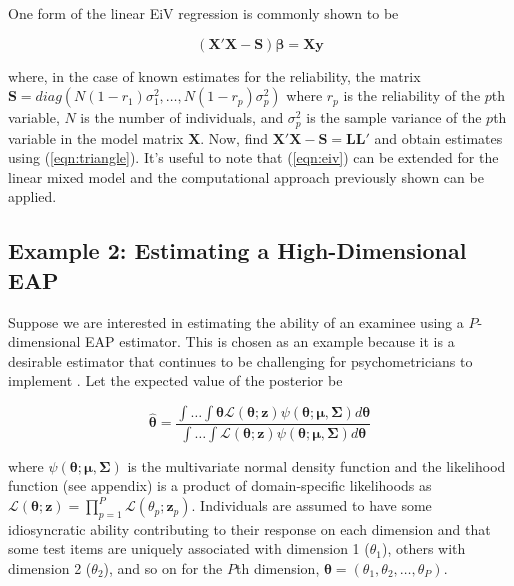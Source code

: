 \documentclass[12pt]{article}
\begin{document}
One form of the linear EiV regression is commonly shown to be \cite{stata:eiv}

\begin{equation}
\label{eqn:eiv}
(\bm{X}'\bm{X} - \bm{S})\bm{\beta} = \bm{X}\bm{y} 
\end{equation}

\noindent where, in the case of known estimates for the reliability, the matrix $\bm{S} = diag(N(1-r_1)\sigma^2_1, \ldots, N(1-r_p)\sigma^2_p) $ where $r_p$ is the reliability of the $p$th variable, $N$ is the number of individuals, and $\sigma^2_p$ is the sample variance of the $p$th variable in the model matrix $\bm{X}$.  Now, find $\bm{X}'\bm{X} - \bm{S} = \bm{L}\bm{L}'$ and obtain estimates using (\ref{eqn:triangle}). It's useful to note that (\ref{eqn:eiv}) can be extended for the linear mixed model and the computational approach previously shown can be applied. 

\subsection*{Example 2: Estimating a High-Dimensional EAP}

Suppose we are interested in estimating the ability of an examinee using a $P$-dimensional EAP estimator. This is chosen as an example because it is a desirable estimator that continues to be challenging for psychometricians to implement \cite{Chalmers,ferrando}. Let the expected value of the posterior be 

\begin{equation}
\label{eqn:scoreIntegral}
\widehat{\boldsymbol{\theta}} = \frac{\int \dots \int \boldsymbol{\theta} \mathcal{L}(\boldsymbol{\theta};\boldsymbol{z}) \psi(\boldsymbol{\theta};\boldsymbol{\mu},\boldsymbol{\Sigma})d\boldsymbol{\theta}}{\int \dots \int \mathcal{L}(\boldsymbol{\theta};\boldsymbol{z})\psi(\boldsymbol{\theta};\boldsymbol{\mu},\boldsymbol{\Sigma})d\boldsymbol{\theta}}
\end{equation}

\noindent where $\psi(\boldsymbol{\theta};\boldsymbol{\mu},\boldsymbol{\Sigma})$ is the multivariate normal density function and the likelihood function (see appendix) is a product of domain-specific likelihoods as $\mathcal{L}(\boldsymbol{\theta};\boldsymbol{z}) = \prod^P_{p=1}\mathcal{L}(\theta_p;\bm{z}_p)$. Individuals are assumed to have some idiosyncratic ability contributing to their response on each dimension and that some test items are uniquely associated with dimension 1 ($\theta_1$), others with dimension 2 ($\theta_2$), and so on for the $P$th dimension, $\boldsymbol{\theta}\boldsymbol{=}(\theta_1, \theta_2,\dots ,\theta_P)$. 
\end{document}
